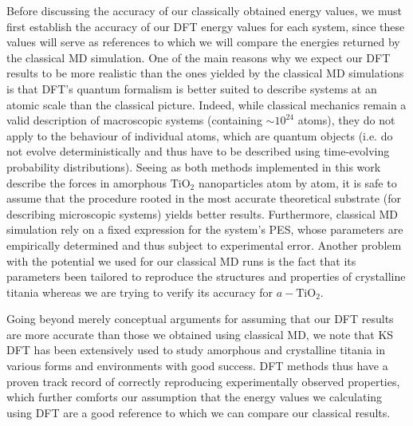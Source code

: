 \documentclass[aps,prb,twocolumn,amsmath,amssymb,superscriptaddress,longbibliography]{revtex4-1}
\newcommand\tab[1][1cm]{\hspace*{#1}} %
\begin{document}
\tab Before discussing the accuracy of our classically obtained energy values, we must first establish the accuracy of our DFT energy values for each system, since these values will serve as references to which we will compare the energies returned by the classical MD simulation.
One of the main reasons why we expect our DFT results to be more realistic than the ones yielded by the classical MD simulations is that DFT's quantum formalism is better suited to describe systems at an atomic scale than the classical picture.
Indeed, while classical mechanics remain a valid description of macroscopic systems (containing $\sim 10^{24}$ atoms), they do not apply to the behaviour of individual atoms, which are quantum objects (i.e. do not evolve deterministically and thus have to be described using time-evolving probability distributions).
Seeing as both methods implemented in this work describe the forces in amorphous $\text{TiO}_2$ nanoparticles atom by atom, it is safe to assume that the procedure rooted in the most accurate theoretical substrate (for describing microscopic systems) yields better results.
Furthermore, classical MD simulation rely on a fixed expression for the system's PES, whose parameters are empirically determined and thus subject to experimental error.
Another problem with the potential we used for our classical MD runs is the fact that its parameters been tailored to reproduce the structures and properties of crystalline titania whereas we are trying to verify its accuracy for $a-\text{TiO}_2$.

\tab Going beyond merely conceptual arguments for assuming that our DFT results are more accurate than those we obtained using classical MD, we note that KS DFT has been extensively used to study amorphous and crystalline titania in various forms and environments with good success\cite{ab_initio,electronic_structure,realistic_nnp,tio2_dft}.
DFT methods thus have a proven track record of correctly reproducing experimentally observed properties, which further comforts our assumption that the energy values we calculating using DFT are a good reference to which we can compare our classical results.
\end{document}
